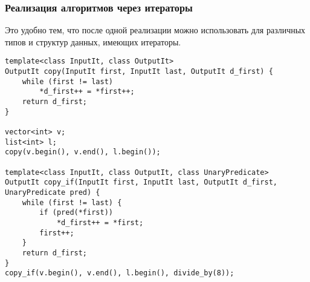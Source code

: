 \subsubsection{Реализация алгоритмов через итераторы}
Это удобно тем, что после одной реализации можно использовать для различных типов и структур данных, имеющих итераторы.
\begin{verbatim}
template<class InputIt, class OutputIt>
OutputIt copy(InputIt first, InputIt last, OutputIt d_first) {
    while (first != last) 
	    *d_first++ = *first++;
    return d_first;
}

vector<int> v;
list<int> l;
copy(v.begin(), v.end(), l.begin());

template<class InputIt, class OutputIt, class UnaryPredicate>
OutputIt copy_if(InputIt first, InputIt last, OutputIt d_first, UnaryPredicate pred) {
    while (first != last) {
	    if (pred(*first))
			*d_first++ = *first;
		first++;
	}
    return d_first;
}
copy_if(v.begin(), v.end(), l.begin(), divide_by(8));
\end{verbatim}
